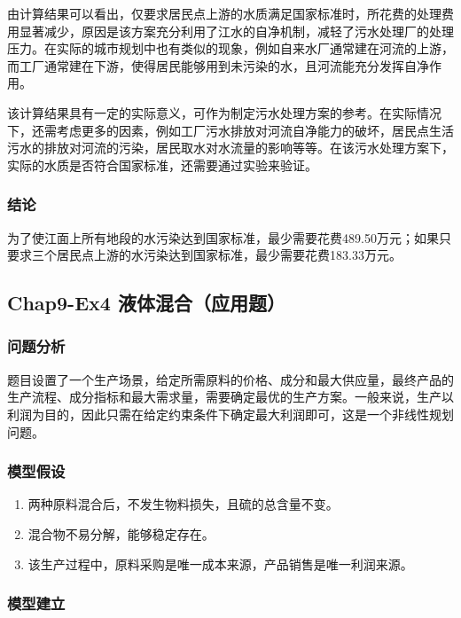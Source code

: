 \documentclass[12pt,a4paper]{article}
\begin{document}
由计算结果可以看出，仅要求居民点上游的水质满足国家标准时，所花费的处理费用显著减少，原因是该方案充分利用了江水的自净机制，减轻了污水处理厂的处理压力。在实际的城市规划中也有类似的现象，例如自来水厂通常建在河流的上游，而工厂通常建在下游，使得居民能够用到未污染的水，且河流能充分发挥自净作用。

该计算结果具有一定的实际意义，可作为制定污水处理方案的参考。在实际情况下，还需考虑更多的因素，例如工厂污水排放对河流自净能力的破坏，居民点生活污水的排放对河流的污染，居民取水对水流量的影响等等。在该污水处理方案下，实际的水质是否符合国家标准，还需要通过实验来验证。

\subsubsection{结论}

为了使江面上所有地段的水污染达到国家标准，最少需要花费489.50万元；如果只要求三个居民点上游的水污染达到国家标准，最少需要花费183.33万元。

\subsection{Chap9-Ex4 液体混合（应用题）}

\subsubsection{问题分析}

题目设置了一个生产场景，给定所需原料的价格、成分和最大供应量，最终产品的生产流程、成分指标和最大需求量，需要确定最优的生产方案。一般来说，生产以利润为目的，因此只需在给定约束条件下确定最大利润即可，这是一个非线性规划问题。

\subsubsection{模型假设}

\begin{enumerate}
    \item 两种原料混合后，不发生物料损失，且硫的总含量不变。
    \item 混合物不易分解，能够稳定存在。
    \item 该生产过程中，原料采购是唯一成本来源，产品销售是唯一利润来源。
\end{enumerate}

\subsubsection{模型建立}
\end{document}
